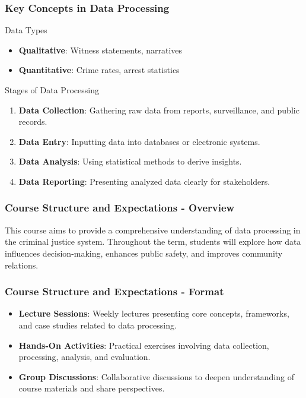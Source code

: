 \documentclass[aspectratio=169]{beamer}
\begin{document}
\begin{frame}[fragile]
    \frametitle{Key Concepts in Data Processing}
    \begin{block}{Data Types}
        \begin{itemize}
            \item \textbf{Qualitative}: Witness statements, narratives
            \item \textbf{Quantitative}: Crime rates, arrest statistics
        \end{itemize}
    \end{block}

    \begin{block}{Stages of Data Processing}
        \begin{enumerate}
            \item \textbf{Data Collection}: Gathering raw data from reports, surveillance, and public records.
            \item \textbf{Data Entry}: Inputting data into databases or electronic systems.
            \item \textbf{Data Analysis}: Using statistical methods to derive insights.
            \item \textbf{Data Reporting}: Presenting analyzed data clearly for stakeholders.
        \end{enumerate}
    \end{block}
\end{frame}

\begin{frame}[fragile]
    \frametitle{Course Structure and Expectations - Overview}
    This course aims to provide a comprehensive understanding of data processing in the criminal justice system. 
    Throughout the term, students will explore how data influences decision-making, enhances public safety, and improves community relations.
\end{frame}

\begin{frame}[fragile]
    \frametitle{Course Structure and Expectations - Format}
    \begin{itemize}
        \item \textbf{Lecture Sessions}: Weekly lectures presenting core concepts, frameworks, and case studies related to data processing.
        \item \textbf{Hands-On Activities}: Practical exercises involving data collection, processing, analysis, and evaluation.
        \item \textbf{Group Discussions}: Collaborative discussions to deepen understanding of course materials and share perspectives.
    \end{itemize}
\end{frame}
\end{document}
